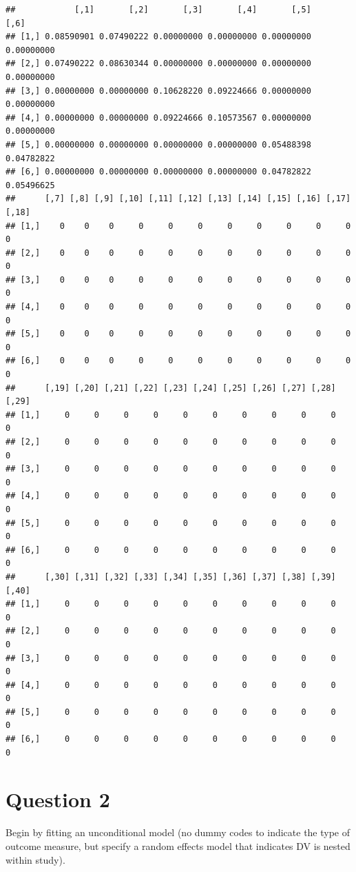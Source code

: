 \documentclass[]{article}
\begin{document}
\begin{verbatim}
##            [,1]       [,2]       [,3]       [,4]       [,5]       [,6]
## [1,] 0.08590901 0.07490222 0.00000000 0.00000000 0.00000000 0.00000000
## [2,] 0.07490222 0.08630344 0.00000000 0.00000000 0.00000000 0.00000000
## [3,] 0.00000000 0.00000000 0.10628220 0.09224666 0.00000000 0.00000000
## [4,] 0.00000000 0.00000000 0.09224666 0.10573567 0.00000000 0.00000000
## [5,] 0.00000000 0.00000000 0.00000000 0.00000000 0.05488398 0.04782822
## [6,] 0.00000000 0.00000000 0.00000000 0.00000000 0.04782822 0.05496625
##      [,7] [,8] [,9] [,10] [,11] [,12] [,13] [,14] [,15] [,16] [,17] [,18]
## [1,]    0    0    0     0     0     0     0     0     0     0     0     0
## [2,]    0    0    0     0     0     0     0     0     0     0     0     0
## [3,]    0    0    0     0     0     0     0     0     0     0     0     0
## [4,]    0    0    0     0     0     0     0     0     0     0     0     0
## [5,]    0    0    0     0     0     0     0     0     0     0     0     0
## [6,]    0    0    0     0     0     0     0     0     0     0     0     0
##      [,19] [,20] [,21] [,22] [,23] [,24] [,25] [,26] [,27] [,28] [,29]
## [1,]     0     0     0     0     0     0     0     0     0     0     0
## [2,]     0     0     0     0     0     0     0     0     0     0     0
## [3,]     0     0     0     0     0     0     0     0     0     0     0
## [4,]     0     0     0     0     0     0     0     0     0     0     0
## [5,]     0     0     0     0     0     0     0     0     0     0     0
## [6,]     0     0     0     0     0     0     0     0     0     0     0
##      [,30] [,31] [,32] [,33] [,34] [,35] [,36] [,37] [,38] [,39] [,40]
## [1,]     0     0     0     0     0     0     0     0     0     0     0
## [2,]     0     0     0     0     0     0     0     0     0     0     0
## [3,]     0     0     0     0     0     0     0     0     0     0     0
## [4,]     0     0     0     0     0     0     0     0     0     0     0
## [5,]     0     0     0     0     0     0     0     0     0     0     0
## [6,]     0     0     0     0     0     0     0     0     0     0     0
\end{verbatim}

\section{Question 2}\label{question-2}

Begin by fitting an unconditional model (no dummy codes to indicate the
type of outcome measure, but specify a random effects model that
indicates DV is nested within study).
\end{document}

